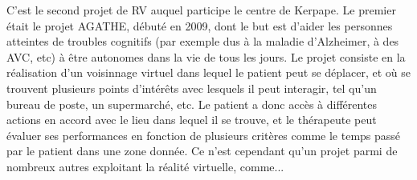 C'est le second projet de RV auquel participe le centre de Kerpape. Le premier était le projet AGATHE, débuté en 2009, dont le but est d'aider les personnes atteintes de troubles cognitifs (par exemple dus à la maladie d'Alzheimer, à des AVC, etc) à être autonomes dans la vie de tous les jours. Le projet consiste en la réalisation d'un \og voisinnage virtuel \fg{} dans lequel le patient peut se déplacer, et où se trouvent plusieurs points d'intérêts avec lesquels il peut interagir, tel qu'un bureau de poste, un supermarché, etc. Le patient a donc accès à différentes actions en accord avec le lieu dans lequel il se trouve, et le thérapeute peut évaluer ses performances en fonction de plusieurs critères comme le temps passé par le patient dans une zone donnée. 
Ce n'est cependant qu'un projet parmi de nombreux autres exploitant la réalité virtuelle, comme...